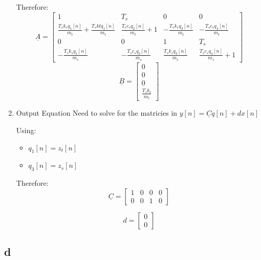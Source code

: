 \documentclass[11pt]{article}
\begin{document}
\begin{enumerate}
Therefore:
\[\underline{A} = \begin{bmatrix}
1 & T_s & 0 & 0 \\
\frac{T_s k_s q_1[n]}{m_t} +  \frac{T_s kt q_1[n]}{m_t} &\frac{T_s c_s q_2[n]}{m_t} +1 & - \frac{T_s k_s q_3[n]}{m_t} & - \frac{T_s c_s q_4[n]}{m_t} \\
0 & 0 & 1 & T_s \\
-\frac{T_s k_s q_1[n]}{m_s} & -\frac{T_s c_s q_2[n]}{m_s} & \frac{T_s k_s q_3[n]}{m_s} & \frac{T_s c_s q_4[n]}{m_s} +1
\end{bmatrix}\]
\[\underline{B} = \begin{bmatrix}
0 \\
0 \\
0 \\
\frac{T_s k_t}{m_t}
\end{bmatrix}\]
\item Output Equation
\label{sec:org92232c3}
Need to solve for the matricies in \(y[n]=\underline{C}q[n]+d x[n]\)

Using:
\begin{itemize}
\item \(q_1[n] = z_t[n]\)
\item \(q_3[n] = z_s[n]\)
\end{itemize}

Therefore:
\[\underline{C} = \begin{bmatrix}
1 & 0 & 0 & 0 \\
0 & 0 & 1 & 0
\end{bmatrix}\]

\[d = \begin{bmatrix}
0 \\
0
\end{bmatrix}\]
\end{enumerate}
\subsection{d}
\label{sec:orgb78a451}
\end{document}
